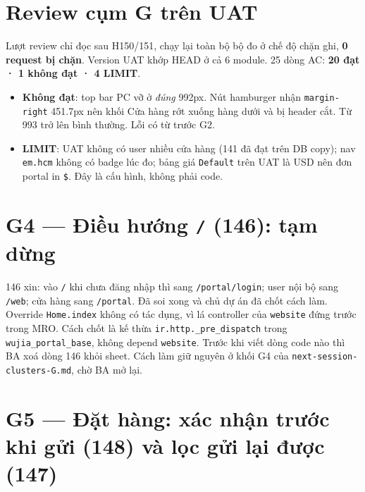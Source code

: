 \section{Review cụm G trên UAT}

Lượt review chỉ đọc sau H150/151, chạy lại toàn bộ bộ đo ở chế độ chặn ghi, \textbf{0 request bị chặn}. Version UAT
khớp HEAD ở cả 6 module. 25 dòng AC: \textbf{20 đạt · 1 không đạt · 4 LIMIT}.
\begin{itemize}[nosep]
\item \textbf{Không đạt}: top bar PC vỡ ở \emph{đúng} 992px. Nút hamburger nhận \texttt{margin-right} 451.7px nên khối Cửa
  hàng rớt xuống hàng dưới và bị header cắt. Từ 993 trở lên bình thường. Lỗi có từ trước G2.
\item \textbf{LIMIT}: UAT không có user nhiều cửa hàng (141 đã đạt trên DB copy); nav \texttt{em.hcm} không có badge lúc đo;
  bảng giá \texttt{Default} trên UAT là USD nên đơn portal in \texttt{\$}. Đây là cấu hình, không phải code.
\end{itemize}

\section{G4 --- Điều hướng \texttt{/} (146): tạm dừng}

146 xin: vào \texttt{/} khi chưa đăng nhập thì sang \texttt{/portal/login}; user nội bộ sang \texttt{/web}; cửa hàng sang
\texttt{/portal}. Đã soi xong và chủ dự án đã chốt cách làm. Override \texttt{Home.index} không có tác dụng, vì lá controller
của \texttt{website} đứng trước trong MRO. Cách chốt là kế thừa \texttt{ir.http.\_pre\_dispatch} trong
\texttt{wujia\_portal\_base}, không depend \texttt{website}. Trước khi viết dòng code nào thì BA xoá dòng 146 khỏi sheet.
Cách làm giữ nguyên ở khối G4 của \texttt{next-session-clusters-G.md}, chờ BA mở lại.

\section{G5 --- Đặt hàng: xác nhận trước khi gửi (148) và lọc gửi lại được (147)}

